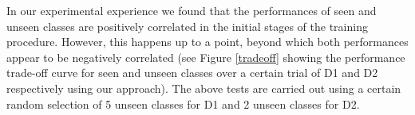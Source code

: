 \documentclass{bmvc2k}
\begin{document}
In our experimental experience we found that the performances of seen and unseen
classes are positively correlated in the initial stages of the training
procedure. However, this happens up to a point, beyond which both performances
appear to be negatively correlated (see Figure \ref{tradeoff} showing the performance
trade-off curve for seen and unseen classes over a certain trial of D1 and D2 respectively using
our approach). The above tests are carried out using a certain random
selection of 5 unseen classes for D1 and 2 unseen classes for D2.

\end{document}
